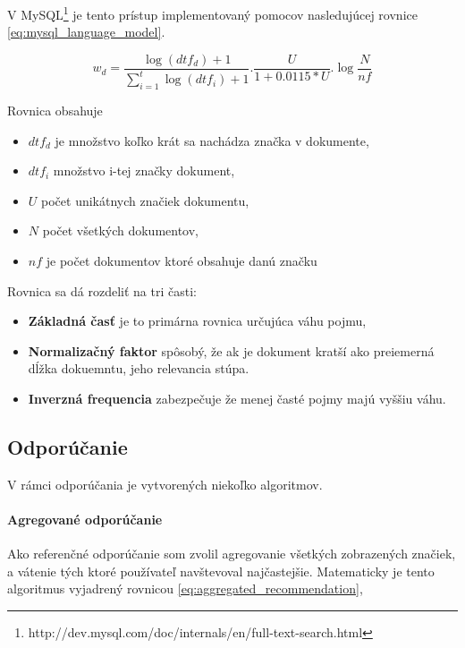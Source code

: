 V MySQL\footnote{http://dev.mysql.com/doc/internals/en/full-text-search.html}
je tento prístup implementovaný pomocov nasledujúcej 
rovnice \ref{eq:mysql_language_model}.

\begin{equation}\label{eq:mysql_language_model}
    w_d = \frac{\log(dtf_d) + 1}{\sum_{i=1}^{t} \log (dtf_i) + 1} .
        \frac{U}{1+0.0115 * U} .
        \log \frac {N}{nf}
\end{equation}

Rovnica obsahuje
\begin{itemize}
\item{\(dtf_d\) je množstvo koľko krát sa nachádza značka v dokumente,}
\item{\(dtf_i\) množstvo i-tej značky dokument,}
\item{\(U\) počet unikátnych značiek dokumentu, }
\item{\(N\) počet všetkých dokumentov, }
\item{\(nf\) je počet dokumentov ktoré obsahuje danú značku}
\end{itemize}

Rovnica sa dá rozdeliť na tri časti:

\begin{itemize}
\item{\textbf{Základná časť} je to primárna rovnica určujúca váhu pojmu,}
\item{\textbf{Normalizačný faktor} spôsobý, že ak je dokument kratší ako preiemerná dĺžka
dokuemntu, jeho relevancia stúpa. \cite{pivoted_doc_len}}
\item{\textbf{Inverzná frequencia} zabezpečuje že menej časté pojmy majú vyššiu váhu.}
\end{itemize}

\subsection{Odporúčanie}

V rámci odporúčania je vytvorených niekoľko algoritmov.

\paragraph{Agregované odporúčanie}

Ako referenčné odporúčanie som zvolil agregovanie všetkých zobrazených značiek, a vátenie
tých ktoré používateľ navštevoval najčastejšie. Matematicky je tento algoritmus vyjadrený
rovnicou \ref{eq:aggregated_recommendation},

